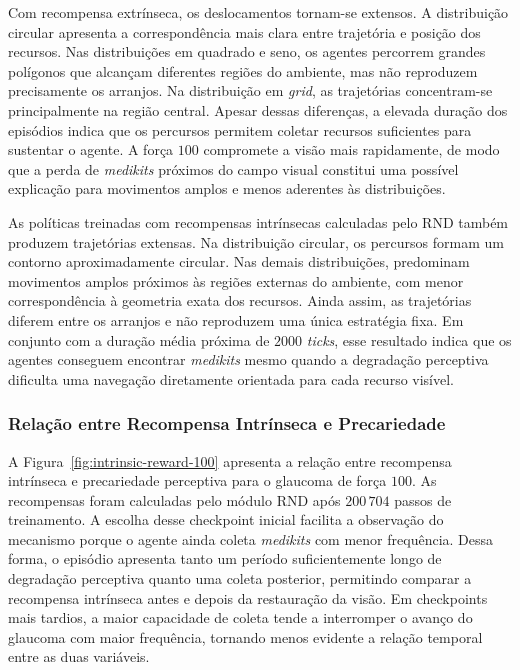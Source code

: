 Com recompensa extrínseca, os deslocamentos tornam-se extensos. A distribuição circular apresenta a correspondência mais clara entre trajetória e posição dos recursos. Nas distribuições em quadrado e seno, os agentes percorrem grandes polígonos que alcançam diferentes regiões do ambiente, mas não reproduzem precisamente os arranjos. Na distribuição em \textit{grid}, as trajetórias concentram-se principalmente na região central. Apesar dessas diferenças, a elevada duração dos episódios indica que os percursos permitem coletar recursos suficientes para sustentar o agente. A força $100$ compromete a visão mais rapidamente, de modo que a perda de \textit{medikits} próximos do campo visual constitui uma possível explicação para movimentos amplos e menos aderentes às distribuições.

As políticas treinadas com recompensas intrínsecas calculadas pelo RND também produzem trajetórias extensas. Na distribuição circular, os percursos formam um contorno aproximadamente circular. Nas demais distribuições, predominam movimentos amplos próximos às regiões externas do ambiente, com menor correspondência à geometria exata dos recursos. Ainda assim, as trajetórias diferem entre os arranjos e não reproduzem uma única estratégia fixa. Em conjunto com a duração média próxima de $2000$ \textit{ticks}, esse resultado indica que os agentes conseguem encontrar \textit{medikits} mesmo quando a degradação perceptiva dificulta uma navegação diretamente orientada para cada recurso visível.

\subsubsection{Relação entre Recompensa Intrínseca e Precariedade}

A Figura~\ref{fig:intrinsic-reward-100} apresenta a relação entre recompensa intrínseca e precariedade perceptiva para o glaucoma de força $100$. As recompensas foram calculadas pelo módulo RND após $200\,704$ passos de treinamento. A escolha desse checkpoint inicial facilita a observação do mecanismo porque o agente ainda coleta \textit{medikits} com menor frequência. Dessa forma, o episódio apresenta tanto um período suficientemente longo de degradação perceptiva quanto uma coleta posterior, permitindo comparar a recompensa intrínseca antes e depois da restauração da visão. Em checkpoints mais tardios, a maior capacidade de coleta tende a interromper o avanço do glaucoma com maior frequência, tornando menos evidente a relação temporal entre as duas variáveis.

